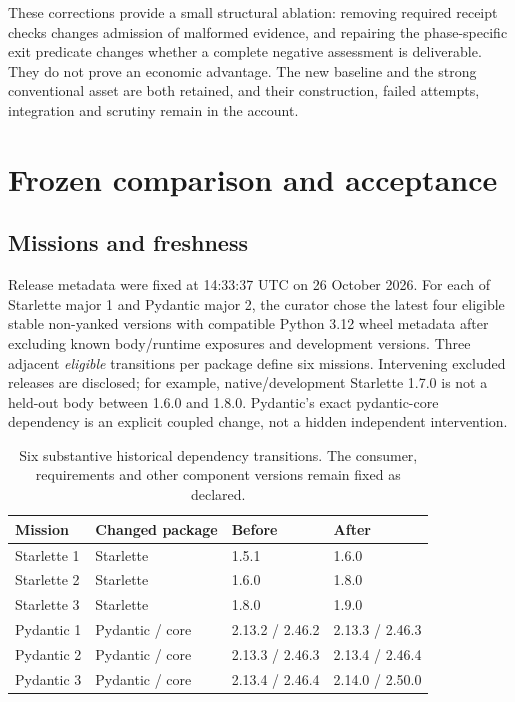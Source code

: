 \documentclass[11pt,a4paper]{article}
\begin{document}
These corrections provide a small structural ablation: removing required receipt checks changes admission of malformed evidence, and repairing the phase-specific exit predicate changes whether a complete negative assessment is deliverable. They do not prove an economic advantage. The new baseline and the strong conventional asset are both retained, and their construction, failed attempts, integration and scrutiny remain in the account.

\section{Frozen comparison and acceptance}
\label{sec:design}

\subsection{Missions and freshness}

Release metadata were fixed at 14:33:37 UTC on 26 October 2026. For each of Starlette major 1 and Pydantic major 2, the curator chose the latest four eligible stable non-yanked versions with compatible Python 3.12 wheel metadata after excluding known body/runtime exposures and development versions. Three adjacent \emph{eligible} transitions per package define six missions. Intervening excluded releases are disclosed; for example, native/development Starlette 1.7.0 is not a held-out body between 1.6.0 and 1.8.0. Pydantic's exact pydantic-core dependency is an explicit coupled change, not a hidden independent intervention.\cite{selection}

\begin{table}[htbp]
\centering\small
\begin{tabular}{@{}llll@{}}
\toprule
Mission & Changed package & Before & After \\
\midrule
Starlette 1 & Starlette & 1.5.1 & 1.6.0 \\
Starlette 2 & Starlette & 1.6.0 & 1.8.0 \\
Starlette 3 & Starlette & 1.8.0 & 1.9.0 \\
Pydantic 1 & Pydantic / core & 2.13.2 / 2.46.2 & 2.13.3 / 2.46.3 \\
Pydantic 2 & Pydantic / core & 2.13.3 / 2.46.3 & 2.13.4 / 2.46.4 \\
Pydantic 3 & Pydantic / core & 2.13.4 / 2.46.4 & 2.14.0 / 2.50.0 \\
\bottomrule
\end{tabular}
\caption{Six substantive historical dependency transitions. The consumer, requirements and other component versions remain fixed as declared.}
\label{tab:missions}
\end{table}
\end{document}
